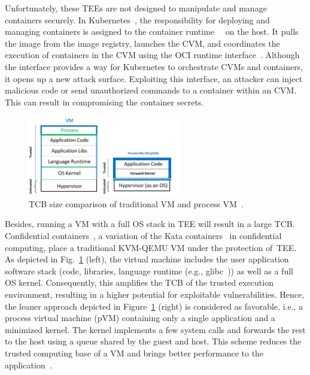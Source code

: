 Unfortunately, these \acrshort{TEE}s are not designed to manipulate and manage containers securely. In Kubernetes~\cite*{k8s}, the responsibility for deploying and managing containers is assigned to the container runtime~\cite*{containerd}~\cite*{cri-o} on the host. It pulls the image from the image registry, launches the \acrshort{CVM}, and coordinates the 
execution of containers in the \acrshort{CVM} using the OCI runtime interface~\cite*{oci-runtime-spec}. Although the interface provides a way for Kubernetes to orchestrate \acrshort{CVM}s and containers, it opens up a new attack surface. Exploiting this interface, an attacker can inject malicious code or send unauthorized commands to 
a container within an \acrshort{CVM}. This can result in compromising the container secrets.
 
 
\begin{figure}[!htb]
  \centering
  \includegraphics[width=0.6\textwidth]{images/VM_vs_PVM.png}
  \caption[TCB size comparison of traditional VM and process VM]{TCB size comparison of traditional VM and process VM~\cite*{10.1145/3436512}.}
  \label{fig:VM_vs_PVM}
\end{figure}
 
Besides, running a VM with a full OS stack in \acrshort{TEE}  will result in a large \acrshort{TCB}. Confidential containers~\cite*{confidential_kata}, a variation of the Kata containers~\cite*{Kata-Containers} in confidential computing, place a traditional KVM-QEMU VM under the protection 
of~\acrshort{TEE}. As depicted in Fig.~\ref{fig:VM_vs_PVM} (left), the virtual machine includes the user application software stack (code, libraries, language runtime (e.g., glibc~\cite*{glibc})) as well as a full OS kernel. Consequently, this amplifies the \acrshort{TCB} of the trusted execution 
environment, resulting in a higher potential for exploitable vulnerabilities. Hence, the leaner approach depicted in Figure~\ref{fig:VM_vs_PVM} (right) is considered as favorable, i.e., a process virtual machine (\acrshort{pVM}) containing only a single application and a minimized kernel. 
The kernel implements a few system calls and forwards the rest to the host using a queue shared by the guest and host. This scheme reduces the trusted computing base of a VM and brings better performance to the application~\cite*{quark_performance_report}.
 

